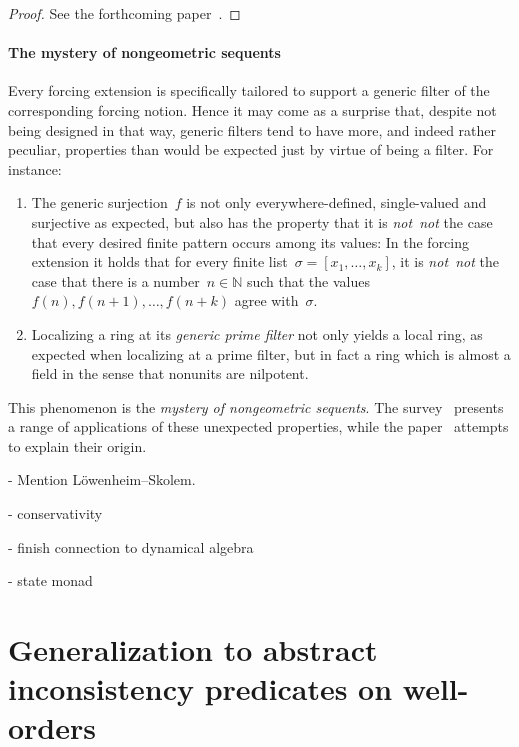 \documentclass[com,11pt,crcready]{iosart2x}
\theoremstyle{definition}
\theoremstyle{plain}
\theoremstyle{remark}
\newcommand{\?}{\,{:}\,}
\renewcommand{\_}{\mathpunct{.}\,}
\begin{document}
\begin{proof}See the forthcoming
paper~\cite{blechschmidt-oldenziel:multiverse}.\end{proof}


\paragraph{The mystery of nongeometric sequents} Every forcing extension is
specifically tailored to support a generic filter of the corresponding forcing
notion. Hence it may come as a surprise that, despite not being designed in that way,
generic filters tend to have more, and indeed rather peculiar, properties
than would be expected just by virtue of being a filter. For instance:
\begin{enumerate}
\item The generic surjection~$f$ is not only everywhere-defined,
single-valued and surjective as expected, but also has the property that it is
\emph{not~not} the case that every desired finite pattern occurs among its
values: In the forcing extension it holds that for every finite list~$\sigma =
[x_1,\ldots,x_k]$, it is \emph{not~not} the case that there is a number~$n \in
\mathbb{N}$ such that the values~$f(n), f(n+1), \ldots, f(n+k)$ agree
with~$\sigma$.

\item Localizing a ring at its \emph{generic prime filter} not only
yields a local ring, as expected when localizing at a prime filter, but in fact
a ring which is almost a field in the sense that nonunits are nilpotent.
\end{enumerate}

This phenomenon is the \emph{mystery of nongeometric sequents}. The
survey~\cite[Section~3]{blechschmidt:generalized-spaces} presents a range of
applications of these unexpected properties, while the
paper~\cite{blechschmidt:nullstellensatz} attempts to explain their origin.

\color{gray}

- Mention
  Löwenheim--Skolem.

- conservativity

- finish connection to dynamical algebra

- state monad

\color{black}


\section{Generalization to abstract inconsistency predicates on well-orders}
\label{sect:inc-wf}
\end{document}
